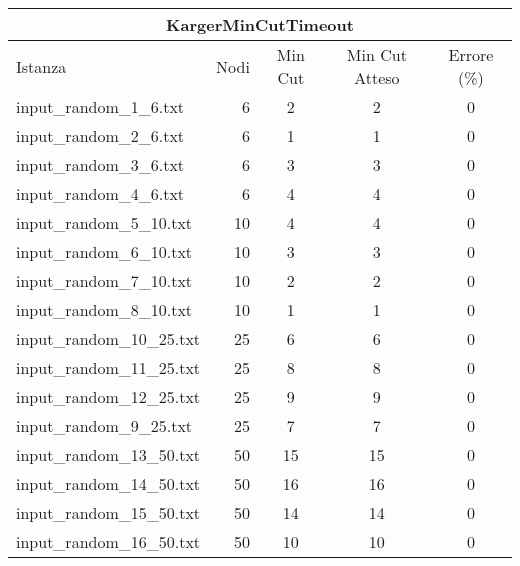 \begin{table}[H]
    \centering

    \begin{tabular}{lrccc}
     \hline
     \multicolumn{5}{c}{KargerMinCutTimeout} \\
     \hline
     Istanza                    &    Nodi &   Min Cut &     Min Cut Atteso &     Errore (\%) \\
     \hline
     input\_random\_1\_6.txt    &       6 &         2 &                  2 &           0     \\
     input\_random\_2\_6.txt    &       6 &         1 &                  1 &           0     \\
     input\_random\_3\_6.txt    &       6 &         3 &                  3 &           0     \\
     input\_random\_4\_6.txt    &       6 &         4 &                  4 &           0     \\
     input\_random\_5\_10.txt   &      10 &         4 &                  4 &           0     \\
     input\_random\_6\_10.txt   &      10 &         3 &                  3 &           0     \\
     input\_random\_7\_10.txt   &      10 &         2 &                  2 &           0     \\
     input\_random\_8\_10.txt   &      10 &         1 &                  1 &           0     \\
     input\_random\_10\_25.txt  &      25 &         6 &                  6 &           0     \\
     input\_random\_11\_25.txt  &      25 &         8 &                  8 &           0     \\
     input\_random\_12\_25.txt  &      25 &         9 &                  9 &           0     \\
     input\_random\_9\_25.txt   &      25 &         7 &                  7 &           0     \\
     input\_random\_13\_50.txt  &      50 &        15 &                 15 &           0     \\
     input\_random\_14\_50.txt  &      50 &        16 &                 16 &           0     \\
     input\_random\_15\_50.txt  &      50 &        14 &                 14 &           0     \\
     input\_random\_16\_50.txt  &      50 &        10 &                 10 &           0     \\

\end{tabular}
\end{table}
